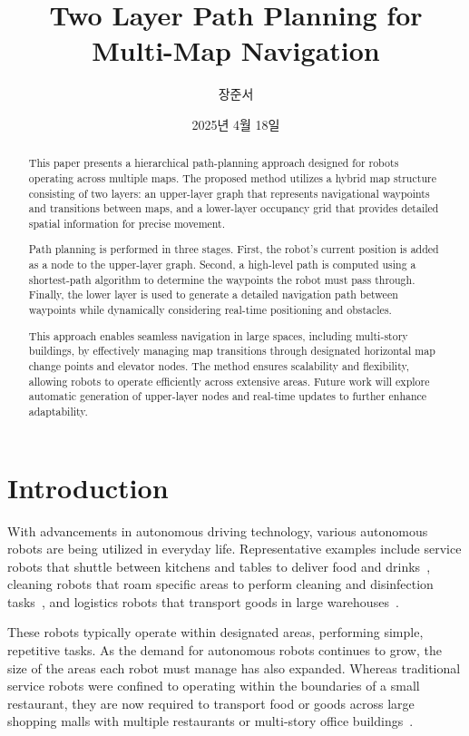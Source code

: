 \documentclass[en]{snu-cse-bsc-thesis}
\title{Two Layer Path Planning for Multi-Map Navigation}
\author{장준서}
\date{2025년 4월 18일}
\begin{document}
\maketitle

\begin{abstract}
This paper presents a hierarchical path-planning approach designed for robots operating across multiple maps. The proposed method utilizes a hybrid map structure consisting of two layers: an upper-layer graph that represents navigational waypoints and transitions between maps, and a lower-layer occupancy grid that provides detailed spatial information for precise movement.  

Path planning is performed in three stages. First, the robot's current position is added as a node to the upper-layer graph. Second, a high-level path is computed using a shortest-path algorithm to determine the waypoints the robot must pass through. Finally, the lower layer is used to generate a detailed navigation path between waypoints while dynamically considering real-time positioning and obstacles.  

This approach enables seamless navigation in large spaces, including multi-story buildings, by effectively managing map transitions through designated horizontal map change points and elevator nodes. The method ensures scalability and flexibility, allowing robots to operate efficiently across extensive areas. Future work will explore automatic generation of upper-layer nodes and real-time updates to further enhance adaptability.

\end{abstract}

\tableofcontents
\listoftables
\listoffigures

\chapter{Introduction}\label{chap:introduction}
With advancements in autonomous driving technology, various autonomous robots are being utilized in everyday life. 
Representative examples include service robots that shuttle between kitchens and tables to deliver food and drinks~\cite{ServiPlus}, cleaning robots that roam specific areas to perform cleaning and disinfection tasks~\cite{ServiAir}, and logistics robots that transport goods in large warehouses~\cite{Carti100}.

These robots typically operate within designated areas, performing simple, repetitive tasks. As the demand for autonomous robots continues to grow, the size of the areas each robot must manage has also expanded. Whereas traditional service robots were confined to operating within the boundaries of a small restaurant, they are now required to transport food or goods across large shopping malls with multiple restaurants or multi-story office buildings~\cite{ServiLift}.
\end{document}

